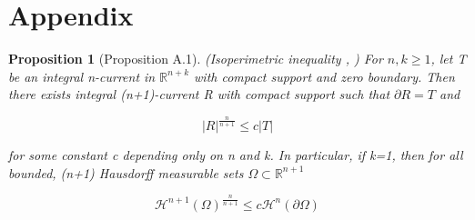 \documentclass{amsart}
\theoremstyle{named}
\newtheorem*{namedprop}{Proposition}
\begin{document}
\section{Appendix}

\begin{namedprop}[Proposition A.1] (Isoperimetric inequality \cite{simon}, \cite{jeff}) For $n,k \geq 1$, let T be an integral n-current in $\mathbb{R}^{n+k}$ with compact support and zero boundary. Then there exists integral (n+1)-current R with compact support such that $\partial R = T$ and 

    \begin{equation} \nonumber 
        |R|^{\frac{n}{n+1}} \leq c|T|
    \end{equation}

for some constant c depending only on n and k. In particular, if k=1, then for all bounded, (n+1) Hausdorff measurable sets $\Omega \subset \mathbb{R}^{n+1}$

    \begin{equation} \nonumber 
        \mathcal{H}^{n+1}(\Omega)^{\frac{n}{n+1}} \leq c \mathcal{H}^n(\partial \Omega)
    \end{equation}
    
\end{namedprop}

\medskip


\end{document}
